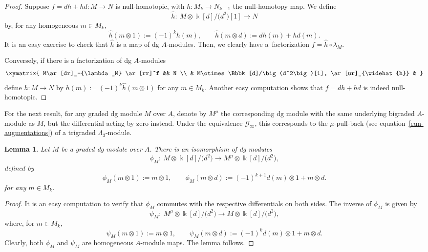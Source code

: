 \documentclass[10pt,a4paper]{amsart}
\newtheorem{lem}[thm]{Lemma}
\theoremstyle{definition}
\numberwithin{equation}{section}
\def\lra{{\longrightarrow}}
\def\mc{\mathcal}
\begin{document}
\begin{proof}Suppose $f=dh+hd\colon M\lra N$ is null-homotopic, with $h\colon M_{k}\lra N_{k-1}$ the null-homo\-topy map. We define
\[
\widehat{h}\colon \ M\otimes \Bbbk[d]/\big(d^2\big)[1]\lra N
\]
by, for any homogeneous $m\in M_{k}$,
\[
\widehat{h}(m\otimes 1):= (-1)^{k}h(m),\qquad \widehat{h}(m\otimes d):=dh(m)+hd(m).
\]
It is an easy exercise to check that $\widehat{h}$ is a map of dg $A$-modules. Then, we clearly have a~fac\-toriza\-tion $ f=\widehat{h}\circ \lambda_M $.

Conversely, if there is a factorization of dg $A$-modules
\[
\begin{gathered}
\xymatrix{
M\ar[dr]_-{\lambda_M} \ar[rr]^f && N \\
 & M\otimes \Bbbk[d]/\big(d^2\big)[1], \ar[ur]_{\widehat{h}} &
}
\end{gathered}
\]
define $h\colon M\lra N$ by $h(m):=(-1)^k\widehat{h}(m\otimes 1)$ for any $m\in M_{k}$. Another easy computation shows that $f=dh+hd$ is indeed null-homotopic.
\end{proof}

For the next result, for any graded dg module $M$ over $A$, denote by $M^\mu$ the corresponding dg module with the same underlying bigraded $A$-module as $M$, but the differential acting by zero instead. Under the equivalence $\mc{G}_\infty$, this corresponds to the $\mu$-pull-back (see equation~\eqref{eqn-augmentations}) of a trigraded $\Lambda_3$-module.

\begin{lem}\label{lem-iso-dg-contractible-mod}
Let $M$ be a graded dg module over $A$. There is an isomorphism of dg modules
\[
\phi_M\colon \ M\otimes \Bbbk[d]/\big(d^2\big) \lra M^\mu \otimes \Bbbk[d]/\big(d^2\big),
\]
defined by
\[
\phi_M(m\otimes 1):= m\otimes 1, \qquad \phi_M(m\otimes d):= (-1)^{k+1}d(m)\otimes 1+m\otimes d.
\]
for any $m\in M_{k}$.
\end{lem}
\begin{proof}It is an easy computation to verify that $\phi_M$ commutes with the respective differentials on both sides. The inverse of $\phi_M$ is given by
\[
\psi_M \colon \ M^\mu\otimes \Bbbk[d]/\big(d^2\big)\lra M\otimes \Bbbk[d]/\big(d^2\big),
\]
where, for $m\in M_{k}$,
\[
\psi_M(m\otimes 1):=m\otimes 1,\qquad \psi_{M}(m\otimes d):=(-1)^kd(m)\otimes 1+m\otimes d.
\]
Clearly, both $\phi_M$ and $\psi_M$ are homogeneous $A$-module maps. The lemma follows.
\end{proof}
\end{document}
